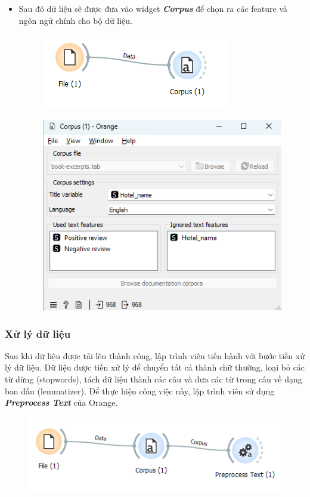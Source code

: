 \begin{itemize}
    \item Sau đó dữ liệu sẽ được đưa vào widget \textbf{\textit{Corpus}} để chọn ra các feature và ngôn ngữ chính cho bộ dữ liệu.

    \begin{figure}[H]
        \centering
        \includegraphics[width=0.5\linewidth]{Figures/10.3.png}
        \label{fig:enter-label}
    \end{figure}

    \begin{figure}[H]
        \centering
        \includegraphics[width=0.5\linewidth]{Figures/10.4.png}
        \label{fig:enter-label}
    \end{figure}
\end{itemize}
\subsubsection{Xử lý dữ liệu}
Sau khi dữ liệu được tải lên thành công, lập trình viên tiến hành với bước tiền xử lý dữ liệu. Dữ liệu được tiền xử lý để chuyển tất cả thành chữ thường, loại bỏ các từ dừng (stopwords), tách dữ liệu thành các câu và đưa các từ trong câu về dạng ban đầu (lemmatizer). Để thực hiện công việc này, lập trình viên sử dụng \textbf{\textit{Preprocess Text}} của Orange.

\begin{figure}[H]
    \centering
    \includegraphics[width=0.5\linewidth]{Figures/10.5.png}
    \label{fig:enter-label}
\end{figure}

